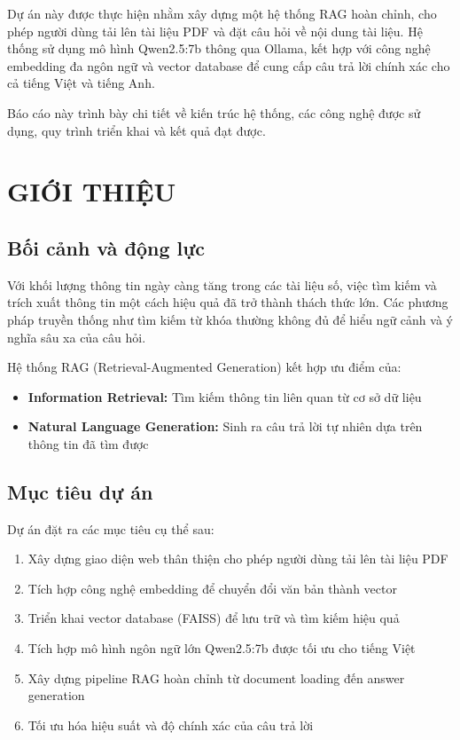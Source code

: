 \documentclass[a4paper]{article}
\begin{document}
Dự án này được thực hiện nhằm xây dựng một hệ thống RAG hoàn chỉnh, cho phép người dùng tải lên tài liệu PDF và đặt câu hỏi về nội dung tài liệu. %
Hệ thống sử dụng mô hình Qwen2.5:7b thông qua Ollama, kết hợp với công nghệ embedding đa ngôn ngữ và vector database để cung cấp câu trả lời chính xác cho cả tiếng Việt và tiếng Anh. %

Báo cáo này trình bày chi tiết về kiến trúc hệ thống, các công nghệ được sử dụng, quy trình triển khai và kết quả đạt được. %
\vfill 
\newpage
\section{GIỚI THIỆU} %

\subsection{Bối cảnh và động lực} %
Với khối lượng thông tin ngày càng tăng trong các tài liệu số, việc tìm kiếm và trích xuất thông tin một cách hiệu quả đã trở thành thách thức lớn. %
Các phương pháp truyền thống như tìm kiếm từ khóa thường không đủ để hiểu ngữ cảnh và ý nghĩa sâu xa của câu hỏi. %

Hệ thống RAG (Retrieval-Augmented Generation) kết hợp ưu điểm của: %
\begin{itemize}
    \item \textbf{Information Retrieval:} Tìm kiếm thông tin liên quan từ cơ sở dữ liệu %
    \item \textbf{Natural Language Generation:} Sinh ra câu trả lời tự nhiên dựa trên thông tin đã tìm được %
\end{itemize}

\subsection{Mục tiêu dự án} %
Dự án đặt ra các mục tiêu cụ thể sau: %
\begin{enumerate}
    \item Xây dựng giao diện web thân thiện cho phép người dùng tải lên tài liệu PDF %
    \item Tích hợp công nghệ embedding để chuyển đổi văn bản thành vector %
    \item Triển khai vector database (FAISS) để lưu trữ và tìm kiếm hiệu quả %
    \item Tích hợp mô hình ngôn ngữ lớn Qwen2.5:7b được tối ưu cho tiếng Việt %
    \item Xây dựng pipeline RAG hoàn chỉnh từ document loading đến answer generation %
    \item Tối ưu hóa hiệu suất và độ chính xác của câu trả lời %
\end{enumerate}
\end{document}
